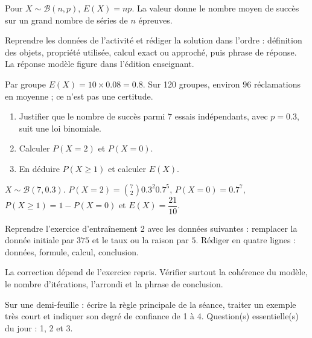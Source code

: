 \begin{summary}Pour $X\sim\mathcal B(n,p)$, $E(X)=np$. La valeur donne le nombre moyen de succès sur un grand nombre de séries de $n$ épreuves.\end{summary}

\begin{example}
Reprendre les données de l'activité et rédiger la solution dans l'ordre : définition des objets, propriété utilisée, calcul exact ou approché, puis phrase de réponse. La réponse modèle figure dans l'édition enseignant.
\end{example}
\begin{solution}Par groupe $E(X)=10\times\num{0,08}=\num{0,8}$. Sur 120 groupes, environ $96$ réclamations en moyenne ; ce n'est pas une certitude.\end{solution}

\begin{exercise}[essentiel]
\begin{enumerate}\item Justifier que le nombre de succès parmi $7$ essais indépendants, avec $p=\num{0,3}$, suit une loi binomiale.\item Calculer $P(X=2)$ et $P(X=0)$.\item En déduire $P(X\geq1)$ et calculer $E(X)$.\end{enumerate}
\end{exercise}
\begin{solution}$X\sim\mathcal B(7,\num{0,3})$. $P(X=2)=\binom{7}2 \num{0,3}^2 \num{0,7}^{5}$, $P(X=0)=\num{0,7}^{7}$, $P(X\geq1)=1-P(X=0)$ et $E(X)=\dfrac{21}{10}$.\end{solution}


\begin{homework}Reprendre l'exercice d'entraînement 2 avec les données suivantes : remplacer la donnée initiale par $375$ et le taux ou la raison par $5$. Rédiger en quatre lignes : données, formule, calcul, conclusion.\end{homework}
\begin{solution}La correction dépend de l'exercice repris. Vérifier surtout la cohérence du modèle, le nombre d'itérations, l'arrondi et la phrase de conclusion.\end{solution}

\begin{exitticket}[3 minutes]Sur une demi-feuille : écrire la règle principale de la séance, traiter un exemple très court et indiquer son degré de confiance de 1 à 4. Question(s) essentielle(s) du jour : 1, 2 et 3.\end{exitticket}

